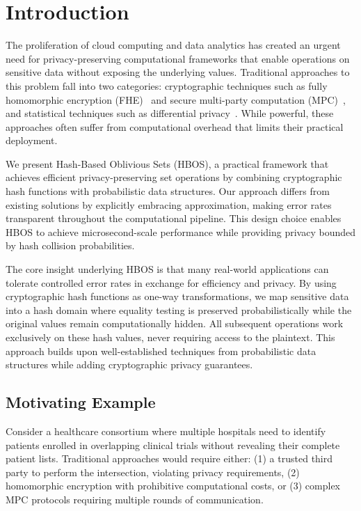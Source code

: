 \documentclass[10pt,conference]{IEEEtran}
\begin{document}
\section{Introduction}

The proliferation of cloud computing and data analytics has created an urgent need for privacy-preserving computational frameworks that enable operations on sensitive data without exposing the underlying values. Traditional approaches to this problem fall into two categories: cryptographic techniques such as fully homomorphic encryption (FHE)~\cite{gentry2009fully} and secure multi-party computation (MPC)~\cite{yao1982protocols}, and statistical techniques such as differential privacy~\cite{dwork2006calibrating}. While powerful, these approaches often suffer from computational overhead that limits their practical deployment.

We present Hash-Based Oblivious Sets (HBOS), a practical framework that achieves efficient privacy-preserving set operations by combining cryptographic hash functions with probabilistic data structures. Our approach differs from existing solutions by explicitly embracing approximation, making error rates transparent throughout the computational pipeline. This design choice enables HBOS to achieve microsecond-scale performance while providing privacy bounded by hash collision probabilities.

The core insight underlying HBOS is that many real-world applications can tolerate controlled error rates in exchange for efficiency and privacy. By using cryptographic hash functions as one-way transformations, we map sensitive data into a hash domain where equality testing is preserved probabilistically while the original values remain computationally hidden. All subsequent operations work exclusively on these hash values, never requiring access to the plaintext. This approach builds upon well-established techniques from probabilistic data structures while adding cryptographic privacy guarantees.

\subsection{Motivating Example}

Consider a healthcare consortium where multiple hospitals need to identify patients enrolled in overlapping clinical trials without revealing their complete patient lists. Traditional approaches would require either: (1) a trusted third party to perform the intersection, violating privacy requirements, (2) homomorphic encryption with prohibitive computational costs, or (3) complex MPC protocols requiring multiple rounds of communication.
\end{document}
